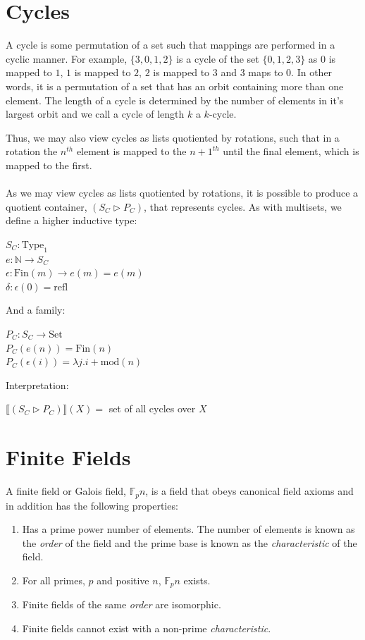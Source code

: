 \documentclass[12pt]{report}
\begin{document}
\section{Cycles}
A cycle is some permutation of a set such that mappings are performed in a cyclic manner. For example, $\{3,0,1,2\}$ is a cycle of the set $\{0,1,2,3\}$ as $0$ is mapped to $1$, $1$ is mapped to $2$, $2$ is mapped to $3$ and $3$ maps to $0$. In other words, it is a permutation of a set that has an orbit containing more than one element. The length of a cycle is determined by the number of elements in it's largest orbit and we call a cycle of length $k$ a $k$-cycle.

Thus, we may also view cycles as lists quotiented by rotations, such that in a rotation the $n^{th}$ element is mapped to the $n+1^{th}$ until the final element, which is mapped to the first.\\
\\
As we may view cycles as lists quotiented by rotations, it is possible to produce a quotient container, $(S_C \rhd P_C)$, that represents cycles. As with multisets, we define a higher inductive type:
\begin{center}
$S_C : \text{Type}_1$\\
$e : \mathbb{N} \to S_C$\\
$\epsilon : \text{Fin}(m) \to e(m) = e(m)$\\
$\delta : \epsilon(0) = \text{refl}$
\end{center}

\noindent And a family:
\begin{center}
$P_C : S_C \to \text{Set}$\\
$P_C(e(n)) = \text{Fin}(n)$\\
$P_C(\epsilon(i)) = \lambda j.i+ \text{mod}(n)$
\end{center}
Interpretation:
\begin{center}
$\llbracket(S_C \rhd P_C)\rrbracket (X) = $ set of all cycles over $X$
\end{center}


\section{Finite Fields}
A finite field or Galois field, $\mathbb{F}_p n$, is a field that obeys canonical field axioms and in addition has the following properties:
\begin{enumerate}
\item Has a prime power number of elements. The number of elements is known as the \textit{order} of the field and the prime base is known as the \textit{characteristic} of the field.
\item For all primes, $p$ and positive $n$, $\mathbb{F}_p n$ exists.
\item Finite fields of the same \textit{order} are isomorphic.
\item Finite fields cannot exist with a non-prime \textit{characteristic}.
\end{enumerate}
\end{document}
